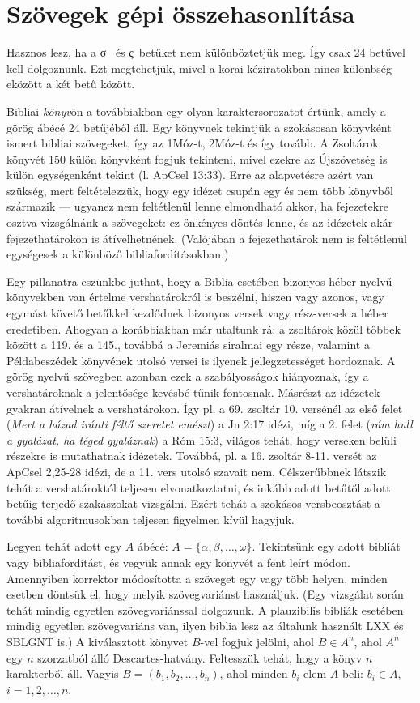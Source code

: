 \documentclass{article}
\newcommand\gr{\selectlanguage{greek}\frenchspacing}
\newcommand\hu{\selectlanguage{magyar}\frenchspacing}
\begin{document}
\section{Szövegek gépi összehasonlítása}

Hasznos lesz, ha a \gr σ  \hu\ és \gr ς\hu\ betűket nem különböztetjük meg. Így csak 24 betűvel kell dolgoznunk.
Ezt megtehetjük, mivel a korai kéziratokban nincs különbség eközött a két betű között.

Bibliai \textit{könyv}ön a továbbiakban egy olyan karaktersorozatot értünk, amely a görög ábécé 24
betűjéből áll. Egy könyvnek tekintjük a szokásosan könyvként ismert bibliai szövegeket,
így az 1Móz-t, 2Móz-t és így tovább. A Zsoltárok könyvét 150 külön könyvként fogjuk tekinteni,
mivel ezekre az Újszövetség is külön egységenként tekint (l. ApCsel 13:33).
Erre az alapvetésre azért van szükség, mert feltételezzük, hogy egy idézet csupán egy és nem több
könyvből származik --- ugyanez nem feltétlenül lenne elmondható akkor, ha fejezetekre osztva
vizsgálnánk a szövegeket: ez önkényes döntés lenne, és az idézetek akár fejezethatárokon is átívelhetnének.
(Valójában a fejezethatárok nem is feltétlenül egységesek a különböző bibliafordításokban.)

Egy pillanatra eszünkbe juthat, hogy a Biblia esetében bizonyos héber nyelvű könyvekben van értelme vershatárokról is
beszélni, hiszen vagy azonos, vagy egymást követő betűkkel kezdődnek bizonyos versek vagy rész-versek a héber
eredetiben. Ahogyan a korábbiakban már utaltunk rá: a zsoltárok közül többek között a 119. és a 145.,
továbbá a Jeremiás siralmai egy része, valamint a Példabeszédek könyvének utolsó versei is ilyenek jellegzetességet
hordoznak.
A görög nyelvű szövegben azonban ezek a szabályosságok hiányoznak, így a vershatároknak
a jelentősége kevésbé tűnik fontosnak. Másrészt az idézetek gyakran átívelnek a vershatárokon.
Így pl. a 69. zsoltár 10. versénél az első felet (\textit{Mert a házad
iránti féltő szeretet emészt}) a Jn 2:17 idézi, míg a 2. felet (\textit{rám hull a gyalázat, ha téged gyaláznak})
a Róm 15:3, világos tehát, hogy verseken belüli részekre is mutathatnak idézetek. Továbbá, pl. a 16. zsoltár
8-11. versét az ApCsel 2,25-28 idézi, de a 11. vers utolsó szavait nem. Célszerűbbnek látszik tehát
a vershatároktól teljesen elvonatkoztatni, és inkább adott betűtől adott betűig terjedő szakaszokat vizsgálni.
Ezért tehát a szokásos versbeosztást a további algoritmusokban teljesen figyelmen kívül hagyjuk.

Legyen tehát adott egy $A$ ábécé: $A=\{\alpha,\beta,\ldots,\omega\}$. Tekintsünk egy adott bibliát
vagy bibliafordítást, és vegyük annak egy könyvét a fent leírt módon. Amennyiben korrektor módosította
a szöveget egy vagy több helyen, minden esetben döntsük el, hogy melyik szövegvariánst használjuk.
(Egy vizsgálat során tehát mindig egyetlen szövegvariánssal dolgozunk. A plauzibilis bibliák esetében
mindig egyetlen szövegvariáns van, ilyen biblia lesz az általunk használt LXX és SBLGNT is.)
A kiválasztott könyvet $B$-vel fogjuk jelölni,
ahol $B\in A^n$, ahol $A^n$ egy $n$ szorzatból álló Descartes-hatvány. Feltesszük tehát, hogy a könyv
$n$ karakterből áll. Vagyis $B=(b_1,b_2,\ldots,b_n)$, ahol minden $b_i$ elem $A$-beli:
$b_i\in A$, $i=1,2,\ldots,n$.
\end{document}
